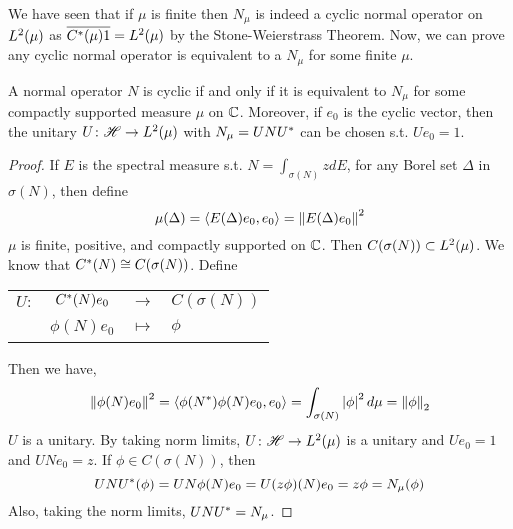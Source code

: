 \documentclass[a4paper,11pt]{report}
\begin{document}
We have seen that if $\mu$ is finite then $N_{\mu}$ is indeed a cyclic normal operator on $L^{2}(\mu)$ as $\overline{C^{*}(\mu)1} = L^{2}(\mu)$ by the Stone-Weierstrass Theorem. Now, we can prove any cyclic normal operator is equivalent to a $N_{\mu}$ for some finite $\mu$.
\begin{thm}
	A normal operator $N$ is cyclic if and only if it is equivalent to $N_{\mu}$ for some compactly supported measure $\mu$ on $\mathbb{C}$. Moreover, if $e_0$ is the cyclic vector, then the unitary $U \colon \mathscr{H} \rightarrow L^{2}(\mu)$ with $N_{\mu} = UNU^{*}$ can be chosen s.t. $Ue_0 = 1$.
\end{thm}
\begin{proof}
	If $E$ is the spectral measure s.t. $N = \int_{\sigma(N)} z dE$, for any Borel set $\Delta$ in $\sigma(N)$, then define
	\begin{equation*}
		\mu(\Delta) = \langle E(\Delta)e_0,e_0 \rangle = \left\lVert E(\Delta)e_0\right\lVert^2
	\end{equation*}
	$\mu$ is finite, positive, and compactly supported on $\mathbb{C}$. Then $C(\sigma(N)) \subset L^{2}(\mu)$. We know that $C^{*}(N) \cong C(\sigma(N))$. Define
	\begin{center}
		\begin{tabular}{l c c l}
			$U \colon$ & $C^{*}(N)e_0$ & $\longrightarrow$ & $C(\sigma(N))$ \\
			~ & $\phi(N)e_0$ & $\longmapsto$ & $\phi$
		\end{tabular}
	\end{center}
	Then we have,
	\begin{equation*}
		\left\lVert\phi(N)e_0\right\lVert^2 = \langle \phi(N^{*})\phi(N)e_0,e_0 \rangle = \int_{\sigma(N)} \left\lvert\phi\right\lvert^2 d\mu = \left\lVert\phi\right\lVert_2
	\end{equation*}
	$U$ is a unitary. By taking norm limits, $U \colon \mathscr{H} \rightarrow L^{2}(\mu)$ is a unitary and $Ue_0 = 1$ and $UNe_0 = z$. If $\phi \in C(\sigma(N))$, then
	\begin{equation*}
		UNU^{*}(\phi) = UN\phi(N)e_0 = U(z\phi)(N)e_0 = z\phi = N_{\mu}(\phi)
	\end{equation*}
	Also, taking the norm limits, $UNU^{*}=N_{\mu}$.
\end{proof}
\end{document}
